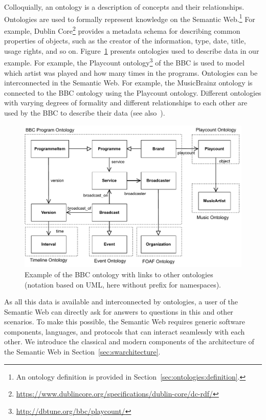 \documentclass[a4paper,USenglish]{tgdk-v2021}
\newcommand{\myurl}[1]{\footnote{\url{#1}}}
\begin{document}
Colloquially, an ontology is a description of concepts and their relationships.
Ontologies are used to formally represent knowledge on the Semantic Web.\footnote{An ontology definition is provided in Section~\ref{sec:ontologies:definition}.}
For example, Dublin Core\myurl{https://www.dublincore.org/specifications/dublin-core/dc-rdf/} provides a metadata schema for describing common properties of objects, such as the creator of the information, type, date, title, usage rights, and so on.
Figure~\ref{fig:bbc-ontology-example} presents ontologies used to describe data in our example.
For example, the Playcount ontology\myurl{http://dbtune.org/bbc/playcount/} of the BBC is used to model which artist was played and how many times in the programs.
Ontologies can be interconnected in the Semantic Web.
For example, the MusicBrainz ontology is connected to the BBC ontology using the Playcount ontology.
Different ontologies with varying degrees of formality and different relationships to each other are used by the BBC to describe their data (see also~\cite{Raimond2009IMR}).

\begin{figure}[ht]
  \centering
   \includegraphics[scale=0.7]{figs/bbc-ontology-example-en}
   \caption{Example of the BBC ontology with links to other ontologies (notation based on UML, here without prefix for namespaces).}
   \label{fig:bbc-ontology-example}
\end{figure}

As all this data is available and interconnected by ontologies, a user of the Semantic Web can directly ask for answers to questions in this and other scenarios.
To make this possible, the Semantic Web requires generic software components, languages, and protocols that can interact seamlessly with each other.
We introduce the classical and modern components of the architecture of the Semantic Web in Section~\ref{sec:swarchitecture}.
\end{document}
